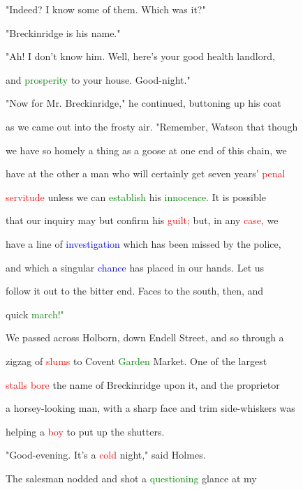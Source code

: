  "Indeed? I know some of them. Which was it?"



 "Breckinridge is his name."



 "Ah! I don't know him. Well, here's your \textcolor{BurntOrange}{good} health landlord,

 and \textcolor{green}{prosperity} to your house. Good-night."



 "Now for Mr. Breckinridge," he continued, buttoning up his coat

 as we came out into the frosty air. "Remember, Watson that though

 we have so homely a thing as a goose at one end of this chain, we

 have at the other a man who will certainly get seven years' \textcolor{red}{penal}

 \textcolor{red}{servitude} unless we can \textcolor{green}{establish} his \textcolor{green}{innocence.} It is possible

 that our \textcolor{BurntOrange}{inquiry} may but confirm his \textcolor{red}{guilt;} but, in any \textcolor{red}{case,} we

 have a line of \textcolor{blue}{investigation} which has been missed by the \textcolor{BurntOrange}{police,}

 and which a singular \textcolor{blue}{chance} has placed in our hands. Let us

 follow it out to the bitter end. Faces to the south, then, and

 quick \textcolor{green}{march!"}



 We passed across Holborn, down Endell Street, and so through a

 zigzag of \textcolor{red}{slums} to Covent \textcolor{green}{Garden} Market. One of the largest

 \textcolor{red}{stalls} \textcolor{red}{bore} the name of Breckinridge upon it, and the proprietor

 a horsey-looking man, with a sharp face and trim side-whiskers was

 helping a \textcolor{red}{boy} to put up the shutters.



 "Good-evening. It's a \textcolor{red}{cold} night," said Holmes.



 The salesman nodded and \textcolor{BurntOrange}{shot} a \textcolor{green}{questioning} glance at my

